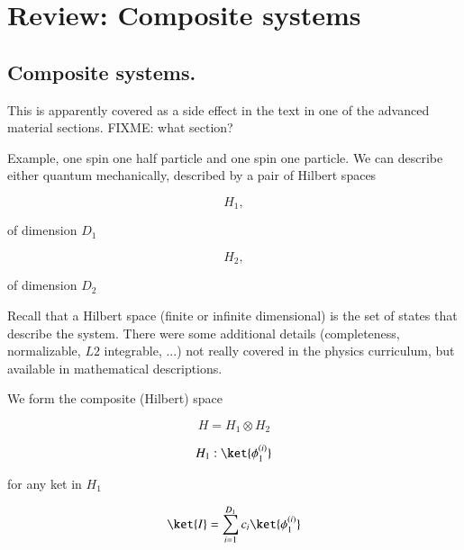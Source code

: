 %
%

\chapter{Review: Composite systems}
\label{chap:qmTwoL1}
{}
\date{Sept 12, 2011}

\beginArtWithToc

\section{Composite systems.}

This is apparently covered as a side effect in the text \cite{desai2009quantum} in one of the advanced material sections.  FIXME: what section?

Example, one spin one half particle and one spin one particle.  We can describe either quantum mechanically, described by a pair of Hilbert spaces

\begin{equation}\label{eqn:qmTwoL1:10}
H_1,
\end{equation}

of dimension $D_1$

\begin{equation}\label{eqn:qmTwoL1:30}
H_2,
\end{equation}

of dimension $D_2$

Recall that a Hilbert space (finite or infinite dimensional) is the set of states that describe the system.  There were some additional details (completeness, normalizable, $L2$ integrable, ...) not really covered in the physics curriculum, but available in mathematical descriptions.

We form the composite (Hilbert) space

\begin{equation}\label{eqn:qmTwoL1:50}
H = H_1 \otimes H_2
\end{equation}

\begin{equation}\label{eqn:qmTwoL1:70}
H_1 : { \ket{\phi_1^{(i)}} }
\end{equation}

for any ket in $H_1$

\begin{equation}\label{eqn:qmTwoL1:90}
\ket{I} = \sum_{i=1}^{D_1} c_i \ket{\phi_1^{(i)}} 
\end{equation}

